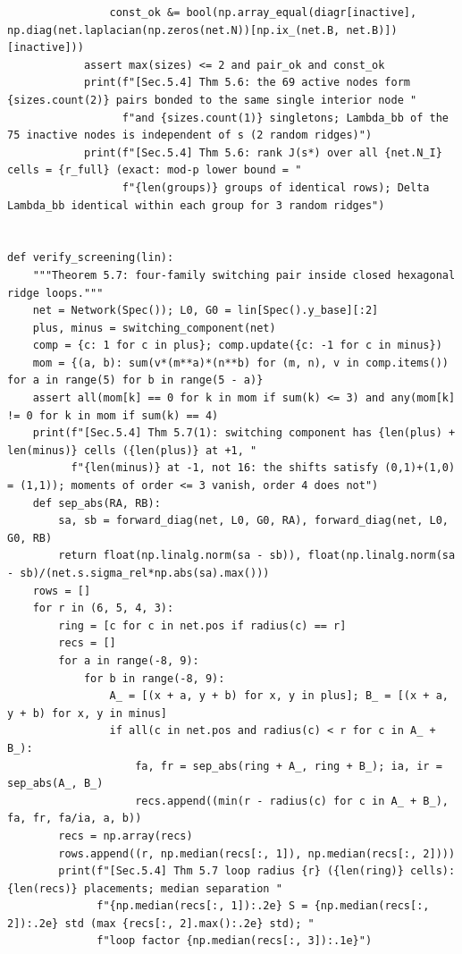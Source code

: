 \documentclass[11pt,a4paper]{article}
\theoremstyle{definition}
\theoremstyle{remark}
\begin{document}
\begin{lstlisting}
                const_ok &= bool(np.array_equal(diagr[inactive], np.diag(net.laplacian(np.zeros(net.N))[np.ix_(net.B, net.B)])[inactive]))
            assert max(sizes) <= 2 and pair_ok and const_ok
            print(f"[Sec.5.4] Thm 5.6: the 69 active nodes form {sizes.count(2)} pairs bonded to the same single interior node "
                  f"and {sizes.count(1)} singletons; Lambda_bb of the 75 inactive nodes is independent of s (2 random ridges)")
            print(f"[Sec.5.4] Thm 5.6: rank J(s*) over all {net.N_I} cells = {r_full} (exact: mod-p lower bound = "
                  f"{len(groups)} groups of identical rows); Delta Lambda_bb identical within each group for 3 random ridges")


def verify_screening(lin):
    """Theorem 5.7: four-family switching pair inside closed hexagonal ridge loops."""
    net = Network(Spec()); L0, G0 = lin[Spec().y_base][:2]
    plus, minus = switching_component(net)
    comp = {c: 1 for c in plus}; comp.update({c: -1 for c in minus})
    mom = {(a, b): sum(v*(m**a)*(n**b) for (m, n), v in comp.items()) for a in range(5) for b in range(5 - a)}
    assert all(mom[k] == 0 for k in mom if sum(k) <= 3) and any(mom[k] != 0 for k in mom if sum(k) == 4)
    print(f"[Sec.5.4] Thm 5.7(1): switching component has {len(plus) + len(minus)} cells ({len(plus)} at +1, "
          f"{len(minus)} at -1, not 16: the shifts satisfy (0,1)+(1,0) = (1,1)); moments of order <= 3 vanish, order 4 does not")
    def sep_abs(RA, RB):
        sa, sb = forward_diag(net, L0, G0, RA), forward_diag(net, L0, G0, RB)
        return float(np.linalg.norm(sa - sb)), float(np.linalg.norm(sa - sb)/(net.s.sigma_rel*np.abs(sa).max()))
    rows = []
    for r in (6, 5, 4, 3):
        ring = [c for c in net.pos if radius(c) == r]
        recs = []
        for a in range(-8, 9):
            for b in range(-8, 9):
                A_ = [(x + a, y + b) for x, y in plus]; B_ = [(x + a, y + b) for x, y in minus]
                if all(c in net.pos and radius(c) < r for c in A_ + B_):
                    fa, fr = sep_abs(ring + A_, ring + B_); ia, ir = sep_abs(A_, B_)
                    recs.append((min(r - radius(c) for c in A_ + B_), fa, fr, fa/ia, a, b))
        recs = np.array(recs)
        rows.append((r, np.median(recs[:, 1]), np.median(recs[:, 2])))
        print(f"[Sec.5.4] Thm 5.7 loop radius {r} ({len(ring)} cells): {len(recs)} placements; median separation "
              f"{np.median(recs[:, 1]):.2e} S = {np.median(recs[:, 2]):.2e} std (max {recs[:, 2].max():.2e} std); "
              f"loop factor {np.median(recs[:, 3]):.1e}")

\end{lstlisting}
\end{document}
